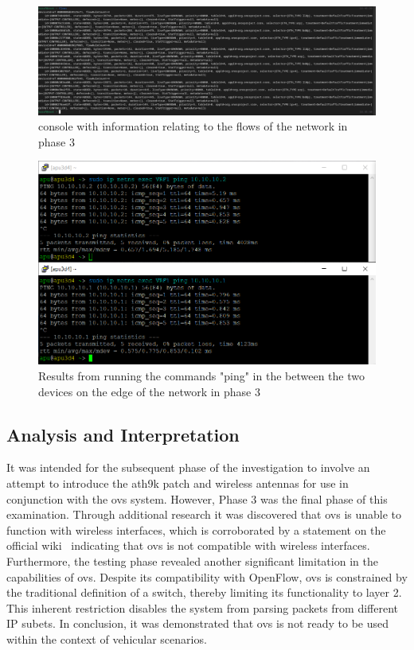 \begin{figure}
	\centering
	\includegraphics[width=\textwidth]{Chapters/Figures/tests/ovs_phase_4/onos_flows.PNG}
	\caption{ console with information relating to the flows of the network in phase 3}
	\label{fig:exp1_phase4_onos_flows}
\end{figure}

\begin{figure}
	\centering
	\includegraphics[width=\textwidth]{Chapters/Figures/tests/ovs_phase_4/pings.PNG}
	\caption{Results from running the commands "ping" in the  between the two devices on the edge of the network in phase 3}
	\label{fig:exp1_phase4_pings}
\end{figure}

\subsection{Analysis and Interpretation}
It was intended for the subsequent phase of the investigation to involve an attempt to introduce the ath9k patch and wireless antennas for use in conjunction with the \gls{ovs} system. However, Phase 3 was the final phase of this examination. Through additional research it was discovered that \gls{ovs} is unable to function with wireless interfaces, which is corroborated by a statement on the official wiki~\cite{noauthor_common_nodate} indicating that \gls{ovs} is not compatible with wireless interfaces.
Furthermore, the testing phase revealed another significant limitation in the capabilities of \gls{ovs}. Despite its compatibility with OpenFlow, \gls{ovs} is constrained by the traditional definition of a switch, thereby limiting its functionality to layer 2. This inherent restriction disables the system from parsing packets from different IP subets.
In conclusion, it was demonstrated that \gls{ovs} is not ready to be used within the context of vehicular scenarios. 

